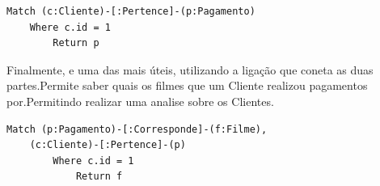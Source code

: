 \begin{lstlisting}[caption=Query ao Neo4j para retornar todos os Pagamentos de um determindado Cliente]
Match (c:Cliente)-[:Pertence]-(p:Pagamento) 
	Where c.id = 1 
		Return p
\end{lstlisting}

Finalmente, e uma das mais úteis, utilizando a ligação que coneta as duas partes.Permite saber quais os filmes que um Cliente realizou pagamentos por.Permitindo realizar uma analise sobre os Clientes.

\begin{lstlisting}[caption=Query ao Neo4j para retornar todos os filmes que um determinar Cliente já pagou por]
Match (p:Pagamento)-[:Corresponde]-(f:Filme),
	(c:Cliente)-[:Pertence]-(p) 
		Where c.id = 1 
			Return f
\end{lstlisting}

